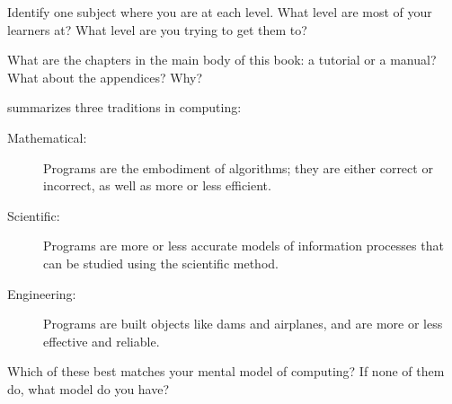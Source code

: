\noindent
Identify one subject where you are at each level.  What level are most
of your learners at?  What level are you trying to get them to?


What are the chapters in the main body of this book: a tutorial or a
manual?  What about the appendices?  Why?


\cite{Tedr2008} summarizes three traditions in computing:

\begin{description}

\item[Mathematical:] Programs are the embodiment of algorithms; they
  are either correct or incorrect, as well as more or less efficient.

\item[Scientific:] Programs are more or less accurate models of
  information processes that can be studied using the scientific
  method.

\item[Engineering:] Programs are built objects like dams and
  airplanes, and are more or less effective and reliable.

\end{description}

\noindent
Which of these best matches your mental model of computing?  If none
of them do, what model do you have?
